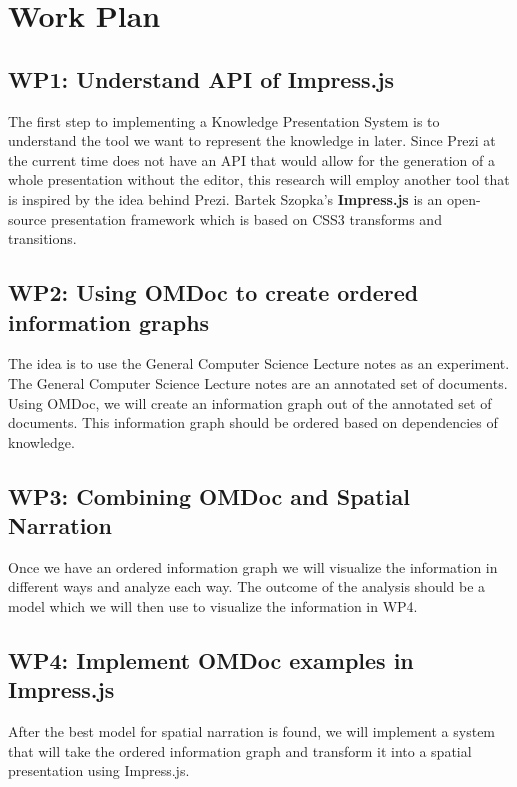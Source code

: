 \documentclass[twoside]{article}
\newcommand{\sys}{Knowledge Presentation System\xspace}
\begin{document}
\newpage

\section{Work Plan}
\subsection{WP1: Understand API of Impress.js}

The first step to implementing a \sys is to understand the tool we want to represent the knowledge in later. Since Prezi at the current time does not have an API that would allow for the generation of a whole presentation without the editor, this research will employ another tool that is inspired by the idea behind Prezi. Bartek Szopka's \textbf{Impress.js} \cite{JSImpress:npentrel14} is an open-source presentation framework which is based on CSS3 transforms and transitions. \\

\subsection{WP2: Using OMDoc to create ordered information graphs}
The idea is to use the General Computer Science Lecture notes as an experiment. The General Computer Science Lecture notes are an annotated set of documents. Using OMDoc, we will create an information graph out of the annotated set of documents. This information graph should be ordered based on dependencies of knowledge.\\

\subsection{WP3: Combining OMDoc and Spatial Narration}
Once we have an ordered information graph we will visualize the information in different ways and analyze each way. The outcome of the analysis should be a model which we will then use to visualize the information in WP4.\\

\subsection{WP4: Implement OMDoc examples in Impress.js}
After the best model for spatial narration is found, we will implement a system that will take the ordered information graph and transform it into a spatial presentation using Impress.js.
\end{document}
